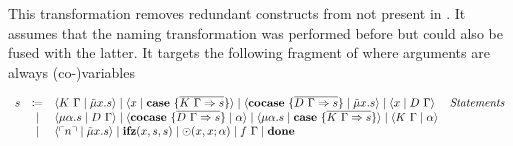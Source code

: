 This transformation removes redundant constructs from \targetlang{} not present in \machinelang.
It assumes that the naming transformation was performed before but could also be fused with the latter.
It targets the following fragment \targetred{} of \targetvar{} where arguments are always (co-)variables

\begin{definition}
  \[
    \begin{array}{rcll}
      s & \coloneqq & \langle K\ \Gamma \mid \tilde{\mu}x.s \rangle \mid \langle x \mid \mathbf{case}\ \{ \overline{K\ \Gamma \Rightarrow s} \} \rangle \mid \langle \mathbf{cocase}\ \{ \overline{D\ \Gamma \Rightarrow s} \} \mid \tilde{\mu}x.s \rangle \mid \langle x \mid D\ \Gamma \rangle & \emph{Statements}\\
       & \mid & \langle \mu\alpha.s \mid D\ \Gamma \rangle \mid \langle \mathbf{cocase}\ \{ \overline{D\ \Gamma \Rightarrow s} \} \mid \alpha \rangle \mid \langle \mu\alpha.s \mid \mathbf{case}\ \{ \overline{K\ \Gamma \Rightarrow s} \} \rangle \mid \langle K\ \Gamma \mid \alpha \rangle & \\
       & \mid & \langle \ulcorner n \urcorner \mid \tilde{\mu}x.s \rangle \mid \mathbf{ifz}(x, s, s) \mid \odot(x, x; \alpha) \mid f\ \Gamma \mid \mathbf{done} & \\
    \end{array}
  \]
\end{definition}


